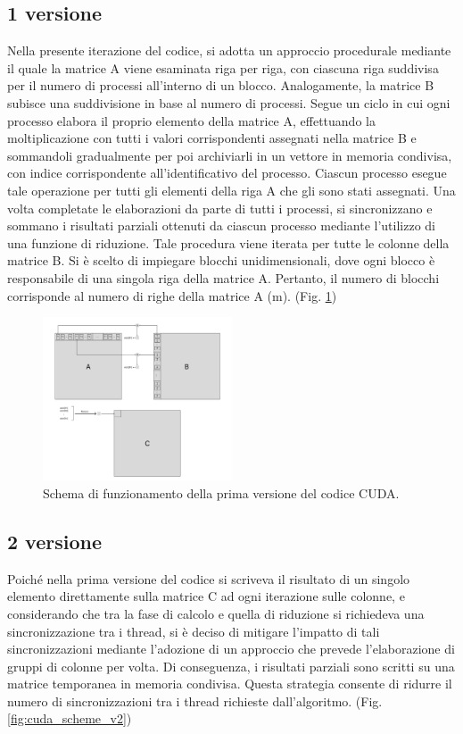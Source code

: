 \documentclass[conference]{IEEEtran}
\begin{document}
\subsection{1 versione}
Nella presente iterazione del codice, si adotta un approccio procedurale mediante il quale la matrice A viene esaminata riga per riga, con ciascuna riga suddivisa per il numero di processi all'interno di un blocco. Analogamente, la matrice B subisce una suddivisione in base al numero di processi. Segue un ciclo in cui ogni processo elabora il proprio elemento della matrice A, effettuando la moltiplicazione con tutti i valori corrispondenti assegnati nella matrice B e sommandoli gradualmente per poi archiviarli in un vettore in memoria condivisa, con indice corrispondente all'identificativo del processo. Ciascun processo esegue tale operazione per tutti gli elementi della riga A che gli sono stati assegnati. Una volta completate le elaborazioni da parte di tutti i processi, si sincronizzano e sommano i risultati parziali ottenuti da ciascun processo mediante l'utilizzo di una funzione di riduzione. Tale procedura viene iterata per tutte le colonne della matrice B. Si è scelto di impiegare blocchi unidimensionali, dove ogni blocco è responsabile di una singola riga della matrice A. Pertanto, il numero di blocchi corrisponde al numero di righe della matrice A (m). (Fig. \ref{fig:cuda_scheme_v1})
\begin{figure}
    \centering
    \includegraphics[width=0.5\textwidth]{resources/cuda_scheme_v1.png}
    \caption{Schema di funzionamento della prima versione del codice CUDA.}
    \label{fig:cuda_scheme_v1}
\end{figure}

\subsection{2 versione}
Poiché nella prima versione del codice si scriveva il risultato di un singolo elemento direttamente sulla matrice C ad ogni iterazione sulle colonne, e considerando che tra la fase di calcolo e quella di riduzione si richiedeva una sincronizzazione tra i thread, si è deciso di mitigare l'impatto di tali sincronizzazioni mediante l'adozione di un approccio che prevede l'elaborazione di gruppi di colonne per volta. Di conseguenza, i risultati parziali sono scritti su una matrice temporanea in memoria condivisa. Questa strategia consente di ridurre il numero di sincronizzazioni tra i thread richieste dall'algoritmo. (Fig. \ref{fig:cuda_scheme_v2})
\end{document}
